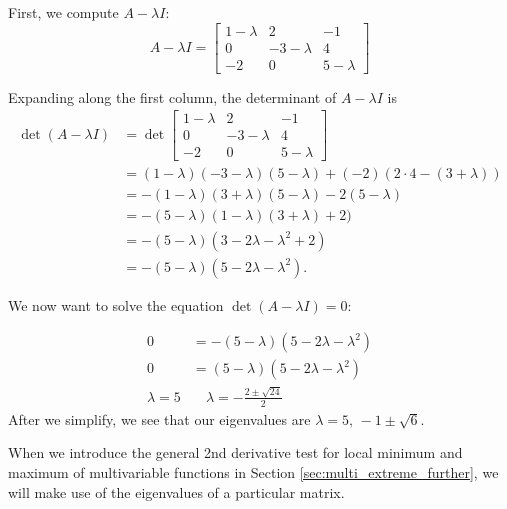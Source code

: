 {First, we compute $A - \lambda I$:
\[A -\lambda I= 
\begin{bmatrix}
	1-\lambda &2& -1 \\
	0 & -3 -\lambda & 4\\
	-2 & 0 & 5-\lambda 	
\end{bmatrix}
\]

Expanding along the first column, the determinant of $A-\lambda I$ is 
\begin{align*}
\det (A-\lambda I) &= \det 
\begin{bmatrix}
	1-\lambda &2& -1 \\
	0 & -3 -\lambda & 4\\
	-2 & 0 & 5-\lambda 	
\end{bmatrix}\\
& = (1-\lambda)(-3-\lambda)(5-\lambda)+(-2)(2\cdot 4 -(3+\lambda))\\
	&= -(1-\lambda)(3+\lambda)(5-\lambda) - 2(5-\lambda) \\
	&= -(5-\lambda)(1-\lambda)(3+\lambda)+2)\\
	&= -(5-\lambda)(3-2\lambda -\lambda^2+2)\\
	&= -(5-\lambda)(5-2\lambda - \lambda^2).
\end{align*}

We now want to solve the equation $\det(A-\lambda I) = 0$:

\begin{align*}
	0 &=-(5-\lambda)(5-2\lambda - \lambda^2)\\
	0 &=(5-\lambda)(5-2\lambda -\lambda^2)\\
	\lambda = 5 &\quad \lambda = -\frac{2\pm\sqrt{24}}{2}
\end{align*}
After we simplify, we see that our eigenvalues are $\lambda = 5,\, -1\pm \sqrt{6}$.
}

\bigskip

When we introduce the general 2nd derivative test for local minimum and maximum of multivariable functions in Section \ref{sec:multi_extreme_further}, we will make use of the eigenvalues of a particular matrix.



